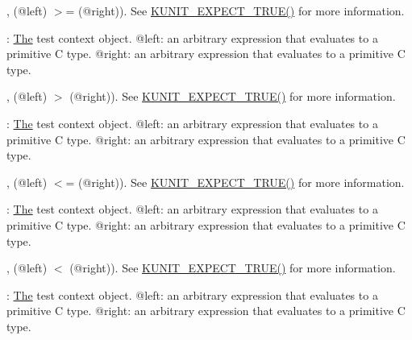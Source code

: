 \begin{DoxyRefList}
\label{test__test000045}%
%
, (@left) $>$= (@right)). See \mbox{\hyperlink{test_8h_a0dcf3441be7037d8702d620899bf33fa}{K\+U\+N\+I\+T\+\_\+\+E\+X\+P\+E\+C\+T\+\_\+\+T\+R\+U\+E()}} for more information.  
\item[Member \mbox{\hyperlink{test_8h_a799c41aa6741cff94303d2b560f4d2f0}{K\+U\+N\+I\+T\+\_\+\+E\+X\+P\+E\+C\+T\+\_\+\+GT}} (test, left, right)]\label{test__test000042}%
%
\+: \mbox{\hyperlink{classThe}{The}} test context object. @left\+: an arbitrary expression that evaluates to a primitive C type. @right\+: an arbitrary expression that evaluates to a primitive C type.

\label{test__test000043}%
%
, (@left) $>$ (@right)). See \mbox{\hyperlink{test_8h_a0dcf3441be7037d8702d620899bf33fa}{K\+U\+N\+I\+T\+\_\+\+E\+X\+P\+E\+C\+T\+\_\+\+T\+R\+U\+E()}} for more information.  
\item[Member \mbox{\hyperlink{test_8h_a511a8a8fe0acff5f6104892c61f3b99e}{K\+U\+N\+I\+T\+\_\+\+E\+X\+P\+E\+C\+T\+\_\+\+LE}} (test, left, right)]\label{test__test000040}%
%
\+: \mbox{\hyperlink{classThe}{The}} test context object. @left\+: an arbitrary expression that evaluates to a primitive C type. @right\+: an arbitrary expression that evaluates to a primitive C type.

\label{test__test000041}%
%
, (@left) $<$= (@right)). See \mbox{\hyperlink{test_8h_a0dcf3441be7037d8702d620899bf33fa}{K\+U\+N\+I\+T\+\_\+\+E\+X\+P\+E\+C\+T\+\_\+\+T\+R\+U\+E()}} for more information.  
\item[Member \mbox{\hyperlink{test_8h_aef0f4c2faee582f6d2a45ab3c49c62ab}{K\+U\+N\+I\+T\+\_\+\+E\+X\+P\+E\+C\+T\+\_\+\+LT}} (test, left, right)]\label{test__test000038}%
%
\+: \mbox{\hyperlink{classThe}{The}} test context object. @left\+: an arbitrary expression that evaluates to a primitive C type. @right\+: an arbitrary expression that evaluates to a primitive C type.

\label{test__test000039}%
%
, (@left) $<$ (@right)). See \mbox{\hyperlink{test_8h_a0dcf3441be7037d8702d620899bf33fa}{K\+U\+N\+I\+T\+\_\+\+E\+X\+P\+E\+C\+T\+\_\+\+T\+R\+U\+E()}} for more information.  
\item[Member \mbox{\hyperlink{test_8h_a174f6214166132fe98b7d88198163d30}{K\+U\+N\+I\+T\+\_\+\+E\+X\+P\+E\+C\+T\+\_\+\+NE}} (test, left, right)]\label{test__test000034}%
%
\+: \mbox{\hyperlink{classThe}{The}} test context object. @left\+: an arbitrary expression that evaluates to a primitive C type. @right\+: an arbitrary expression that evaluates to a primitive C type.


\end{DoxyRefList}
